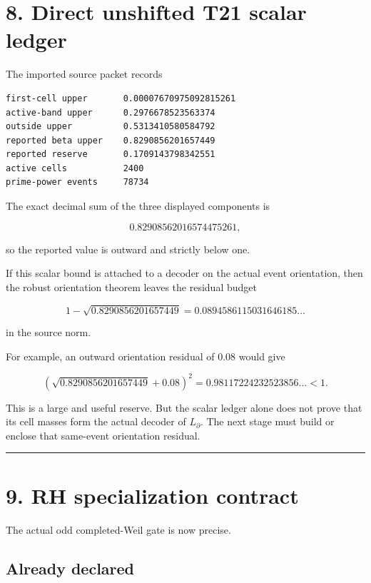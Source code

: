 \hypertarget{direct-unshifted-t21-scalar-ledger}{%
\section{8. Direct unshifted T21 scalar ledger}\label{direct-unshifted-t21-scalar-ledger}}

The imported source packet records

\begin{verbatim}
first-cell upper       0.00007670975092815261
active-band upper      0.2976678523563374
outside upper          0.5313410580584792
reported beta upper    0.8290856201657449
reported reserve       0.1709143798342551
active cells           2400
prime-power events     78734
\end{verbatim}

The exact decimal sum of the three displayed components is

\[
0.82908562016574475261,
\]

so the reported value is outward and strictly below one.

If this scalar bound is attached to a decoder on the actual event orientation,
then the robust orientation theorem leaves the residual budget

\[
\boxed{
1-\sqrt{0.8290856201657449}
=0.0894586115031646185\ldots
}
\]

in the source norm.

For example, an outward orientation residual of \(0.08\) would give

\[
(\sqrt{0.8290856201657449}+0.08)^2
=0.98117224232523856\ldots<1.
\]

This is a large and useful reserve. But the scalar ledger alone does not prove
that its cell masses form the actual decoder of \(L_\partial\). The next stage
must build or enclose that same-event orientation residual.

\begin{center}\rule{0.5\linewidth}{0.5pt}\end{center}

\hypertarget{rh-specialization-contract}{%
\section{9. RH specialization contract}\label{rh-specialization-contract}}

The actual odd completed-Weil gate is now precise.

\hypertarget{already-declared}{%
\subsection{Already declared}\label{already-declared}}

